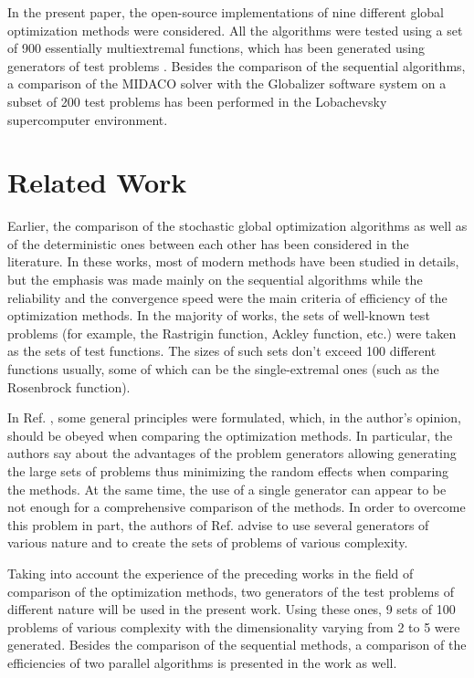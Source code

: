 \documentclass[runningheads]{llncs}
\begin{document}
In the present paper, the open-source implementations of nine different global optimization methods
were considered. All the algorithms were tested using a set of 900 essentially multiextremal functions,
which has been generated using generators of test problems \cite{Gaviano2003, grishaginClass}.
Besides the comparison of the sequential algorithms, a comparison of the MIDACO solver
\cite{Schlueter2012} with the Globalizer software system \cite{globalizerSystem,Strongin2018} on a subset of 200 test problems has been
performed in the Lobachevsky supercomputer environment.


\section{Related Work}

Earlier, the comparison of the stochastic global optimization algorithms \cite{Ali2005, JSSv060i06}
as well as of the deterministic ones \cite{posik2012, KVASOV2018245, Liberti2005} between each
other has been considered in the literature. In these works, most of modern methods have
been studied in details, but the emphasis was made mainly on the sequential algorithms while the
reliability and the convergence speed were the main criteria of efficiency of the optimization
methods. In the majority of works, the sets of well-known test problems (for example, the Rastrigin
function, Ackley function, etc.) were taken as the sets of test functions. The sizes of such sets don't
exceed 100 different functions usually, some of which can be the single-extremal ones (such as the
Rosenbrock function).

In Ref. \cite{Beiranvand2017}, some general principles were formulated, which, in the author's
opinion, should be obeyed when comparing the optimization methods. In particular, the authors say
about the advantages of the problem generators allowing generating the large sets of problems thus
minimizing the random effects when comparing the methods. At the same time, the use of a single
generator can appear to be not enough for a comprehensive comparison of the methods. In order to
overcome this problem in part, the authors of Ref. \cite{Beiranvand2017} advise to use several
generators of various nature and to create the sets of problems of various complexity.

Taking into account the experience of the preceding works in the field of comparison of the
optimization methods, two generators of the test problems of different nature will be used in the
present work. Using these ones, 9 sets of 100 problems of various complexity with the
dimensionality varying from 2 to 5 were generated. Besides the comparison of the sequential
methods, a comparison of the efficiencies of two parallel algorithms is presented in the work as well.
\end{document}
